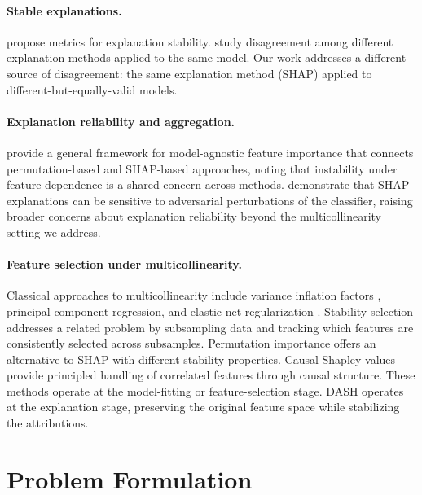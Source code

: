 \documentclass[11pt]{article}
\newcommand{\dash}{\textsc{DASH}}
\begin{document}
\paragraph{Stable explanations.}
\citet{alvarez2018towards} propose metrics for explanation stability.
\citet{krishna2022disagreement} study disagreement among different
explanation methods applied to the same model. Our work addresses a
different source of disagreement: the same explanation method (SHAP)
applied to different-but-equally-valid models.

\paragraph{Explanation reliability and aggregation.}
\citet{molnar2022general} provide a general framework for model-agnostic
feature importance that connects permutation-based and SHAP-based
approaches, noting that instability under feature dependence is a shared
concern across methods. \citet{slack2020fooling} demonstrate that
SHAP explanations can be sensitive to adversarial perturbations of the
classifier, raising broader concerns about explanation reliability
beyond the multicollinearity setting we address.

\paragraph{Feature selection under multicollinearity.}
Classical approaches to multicollinearity include variance inflation
factors \citep{obrien2007caution}, principal component regression, and
elastic net regularization \citep{zou2005regularization}. Stability
selection \citep{meinshausen2010stability} addresses a related problem
by subsampling data and tracking which features are consistently
selected across subsamples. Permutation importance
\citep{altmann2010permutation} offers an alternative to SHAP with
different stability properties. Causal Shapley values
\citep{heskes2020causal} provide principled handling of correlated
features through causal structure. These methods operate at the
model-fitting or feature-selection stage. \dash{} operates at the
explanation stage, preserving the original feature space while
stabilizing the attributions.


\section{Problem Formulation}
\label{sec:problem}
\end{document}
